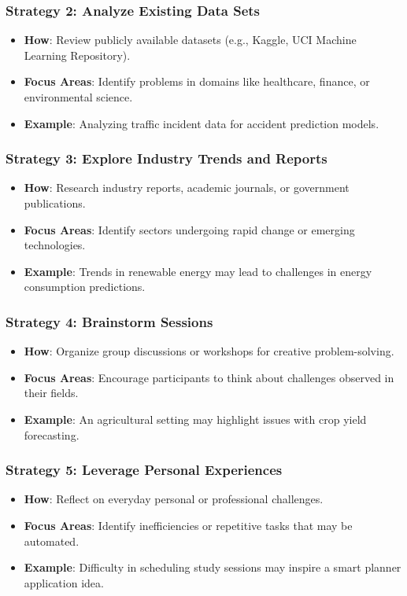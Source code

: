 \documentclass{beamer}
\begin{document}
\begin{frame}[fragile]
    \frametitle{Strategy 2: Analyze Existing Data Sets}
    \begin{itemize}
        \item \textbf{How}: Review publicly available datasets (e.g., Kaggle, UCI Machine Learning Repository).
        \item \textbf{Focus Areas}: Identify problems in domains like healthcare, finance, or environmental science.
        \item \textbf{Example}: Analyzing traffic incident data for accident prediction models.
    \end{itemize}
\end{frame}

\begin{frame}[fragile]
    \frametitle{Strategy 3: Explore Industry Trends and Reports}
    \begin{itemize}
        \item \textbf{How}: Research industry reports, academic journals, or government publications.
        \item \textbf{Focus Areas}: Identify sectors undergoing rapid change or emerging technologies.
        \item \textbf{Example}: Trends in renewable energy may lead to challenges in energy consumption predictions.
    \end{itemize}
\end{frame}

\begin{frame}[fragile]
    \frametitle{Strategy 4: Brainstorm Sessions}
    \begin{itemize}
        \item \textbf{How}: Organize group discussions or workshops for creative problem-solving.
        \item \textbf{Focus Areas}: Encourage participants to think about challenges observed in their fields.
        \item \textbf{Example}: An agricultural setting may highlight issues with crop yield forecasting.
    \end{itemize}
\end{frame}

\begin{frame}[fragile]
    \frametitle{Strategy 5: Leverage Personal Experiences}
    \begin{itemize}
        \item \textbf{How}: Reflect on everyday personal or professional challenges.
        \item \textbf{Focus Areas}: Identify inefficiencies or repetitive tasks that may be automated.
        \item \textbf{Example}: Difficulty in scheduling study sessions may inspire a smart planner application idea.
    \end{itemize}
\end{frame}
\end{document}
